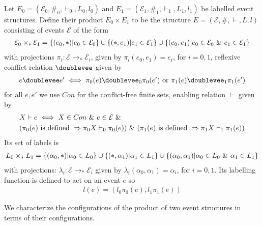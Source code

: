 \documentclass{article}
\begin{document}
\begin{definition}

    Let $E_0 = (\mathcal{E}_0,\#_0,\vdash_0,L_0,l_0)$ and $E_1 = (\mathcal{E}_1,\#_1,\vdash_1,L_1,l_1)$
    be labelled event structures.
    Define their product $E_0 \times E_1$ to be the structure $E = (\mathcal{E},\#,\vdash,L,l)$
    consisting of events $\mathcal{E}$ of the form
    \begin{align*}
        \mathcal{E}_0 \times_* \mathcal{E}_1 =
        \{(e_0,*)|e_0 \in \mathcal{E}_0\}
        \cup \{(*,e_1)|e_1 \in \mathcal{E}_1\}
        \cup \{(e_0,e_1)| e_0 \in \mathcal{E}_0 \ \& \  e_1 \in \mathcal{E}_1\}
    \end{align*}
    with projections $\pi_i : \mathcal{E} \rightarrow_* \mathcal{E}_i$,
    given by $\pi_i(e_0,e_1) = e_i$, for $i=0,1$, reflexive conflict relation $\doublevee$ given by
    \begin{align*}
        e \doublevee e' \iff \pi_0(e) \doublevee_0 \pi_0(e') \text{ or }
        \pi_1(e) \doublevee_1 \pi_1(e')
    \end{align*}
    for all $e,e'$ we use $Con$ for the conflict-free finite sets,
    enabling relation $\vdash$ given by
    \begin{align*}
         & X \vdash e \iff X \in Con \ \& \  e \in \mathcal{E} \ \& \             \\
         & (\pi_0(e)\text{ is defined } \Rightarrow \pi_0X\vdash_0\pi_0(e))
        \ \& \  (\pi_1(e)\text{ is defined } \Rightarrow \pi_1X\vdash_1\pi_1(e))
    \end{align*}
    Its set of labels is
    \begin{align*}
        L_0 \times_* L_1 = \{ (\alpha_0,*)|\alpha_0 \in L_0\}
        \cup \{(*,\alpha_1)|\alpha_1 \in L_1\}
        \cup \{(\alpha_0,\alpha_1)|\alpha_0 \in L_0 \ \& \  \alpha_1 \in L_1\}
    \end{align*}
    with projections: $\lambda_i: \mathcal{E} \rightarrow_* \mathcal{E}_i$ given by
    $\lambda_i(\alpha_0,\alpha_1) = \alpha_i$, for $i=0,1$.
    Its labelling function is defined to act on an event $e$ so
    \begin{align*}
        l(e) = (l_0\pi_0(e),l_1\pi_1(e))
    \end{align*}
\end{definition}
We characterize the configurations of the product of two event structures in terms
of their configurations.
\end{document}
